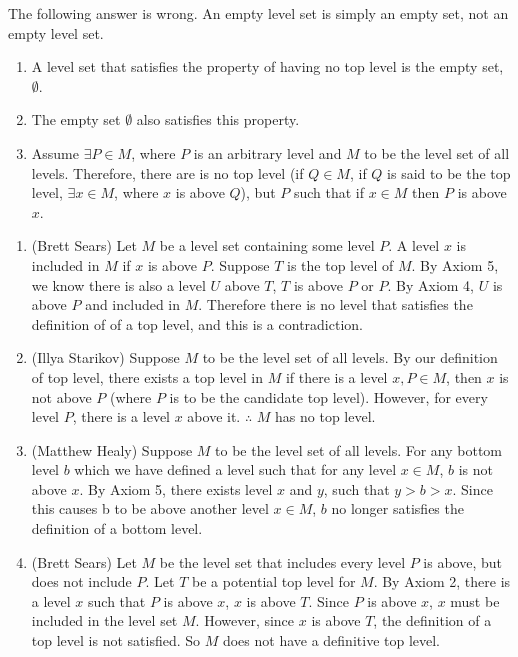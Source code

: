 \problem
The following answer is wrong. An empty level set is simply an empty set, not an empty level set.

\begin{enumerate}[label=(\alph*)]
    \item A level set that satisfies the property of having no top level is the empty set, $\emptyset$.
    \item The empty set $\emptyset$ also satisfies this property.
    \item Assume $\exists P \in M$, where $P$ is an arbitrary level and $M$ to be the level set of all levels. Therefore, there are is no top level (if $Q \in M$, if $Q$ is said to be the top level, $\exists x \in M$, where $x$ is above $Q$), but $P$ such that if $x \in M$ then $P$ is above $x$.
\end{enumerate}


\begin{enumerate}[label=(\alph*)]
    \item (Brett Sears) Let $M$ be a level set containing some level $P$. A level $x$ is included in $M$ if $x$ is above $P$. Suppose $T$ is the top level of $M$. By Axiom 5, we know there is also a level $U$ above $T$, $T$ is above $P$ or $P$. By Axiom 4, $U$ is above $P$ and included in $M$. Therefore there is no level that satisfies the definition of of a top level, and this is a contradiction.

    \setcounter{enumi}{0} %

    \item (Illya Starikov) Suppose $M$ to be the level set of all levels. By our definition of top level, there exists a top level in $M$ if there is a level $x, P \in M$, then $x$ is not above $P$ (where $P$ is to be the candidate top level). However, for every level $P$, there is a level $x$ above it. $\therefore$ $M$ has no top level.

    \item (Matthew Healy) Suppose $M$ to be the level set of all levels. For any bottom level $b$ which we have defined a level such that for any level $x \in M$, $b$ is not above $x$. By Axiom 5, there exists level $x$ and $y$, such that $y > b > x$. Since this causes b to be above another level $x \in M$, $b$ no longer satisfies the definition of a bottom level.

    \item (Brett Sears) Let $M$ be the level set that includes every level $P$ is above, but does not include $P$. Let $T$ be a potential top level for $M$. By Axiom 2, there is a level $x$ such that $P$ is above $x$, $x$ is above $T$. Since $P$ is above $x$, $x$ must be included in the level set $M$. However, since $x$ is above $T$, the definition of a top level is not satisfied. So $M$ does not have a definitive top level.
\end{enumerate}


